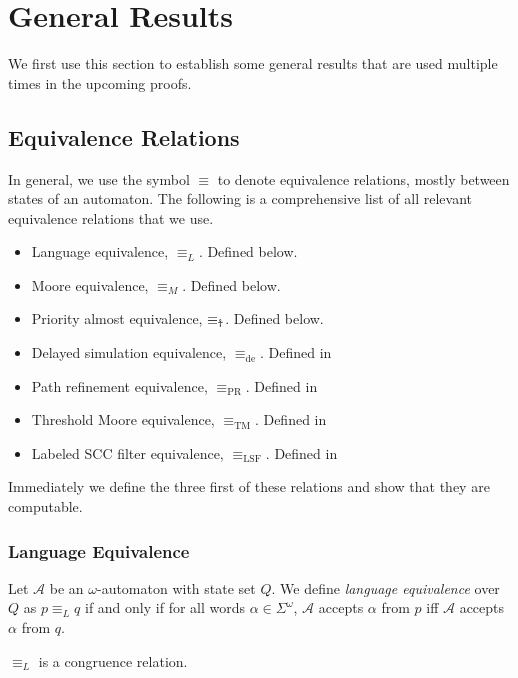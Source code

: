 \section{General Results}
We first use this section to establish some general results that are used multiple times in the upcoming proofs.

\subsection{Equivalence Relations}

In general, we use the symbol $\equiv$ to denote equivalence relations, mostly between states of an automaton. The following is a comprehensive list of all relevant equivalence relations that we use.

\begin{itemize}
	\item Language equivalence, $\equiv_L$. Defined below.
	\item Moore equivalence, $\equiv_M$. Defined below.
	\item Priority almost equivalence, $\equiv_\text{\Ankh}$. Defined below.
	\item Delayed simulation equivalence, $\equiv_\text{de}$. Defined in %
	\item Path refinement equivalence, $\equiv_\text{PR}$. Defined in %
	\item Threshold Moore equivalence, $\equiv_\text{TM}$. Defined in %
	\item Labeled SCC filter equivalence, $\equiv_\text{LSF}$. Defined in %
\end{itemize}

Immediately we define the three first of these relations and show that they are computable.


\subsubsection{Language Equivalence}

\begin{defn}
	Let $\mathcal{A}$ be an $\omega$-automaton with state set $Q$. We define \emph{language equivalence} over $Q$ as $p \equiv_L q$ if and only if for all words $\alpha \in \Sigma^\omega$, $\mathcal{A}$ accepts $\alpha$ from $p$ iff $\mathcal{A}$ accepts $\alpha$ from $q$.
\end{defn}

\begin{lem}
	$\equiv_L$ is a congruence relation.
\end{lem}

